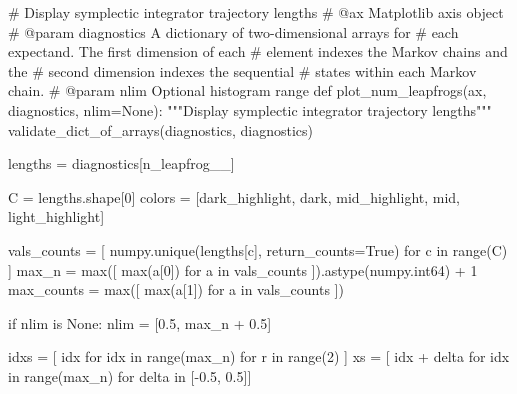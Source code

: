 \documentclass[
  letterpaper,
  DIV=11,
  numbers=noendperiod]{scrartcl}
\newenvironment{Shaded}{\begin{snugshade}}{\end{snugshade}}
\newcommand{\BuiltInTok}[1]{\textcolor[rgb]{0.00,0.23,0.31}{#1}}
\newcommand{\CommentTok}[1]{\textcolor[rgb]{0.37,0.37,0.37}{#1}}
\newcommand{\ControlFlowTok}[1]{\textcolor[rgb]{0.00,0.23,0.31}{#1}}
\newcommand{\DecValTok}[1]{\textcolor[rgb]{0.68,0.00,0.00}{#1}}
\newcommand{\FloatTok}[1]{\textcolor[rgb]{0.68,0.00,0.00}{#1}}
\newcommand{\KeywordTok}[1]{\textcolor[rgb]{0.00,0.23,0.31}{#1}}
\newcommand{\NormalTok}[1]{\textcolor[rgb]{0.00,0.23,0.31}{#1}}
\newcommand{\OperatorTok}[1]{\textcolor[rgb]{0.37,0.37,0.37}{#1}}
\newcommand{\StringTok}[1]{\textcolor[rgb]{0.13,0.47,0.30}{#1}}
\newcommand{\VariableTok}[1]{\textcolor[rgb]{0.07,0.07,0.07}{#1}}
\begin{document}
\begin{Shaded}
\begin{Highlighting}[]
\CommentTok{\# Display symplectic integrator trajectory lengths}
\CommentTok{\# @ax Matplotlib axis object}
\CommentTok{\# @param diagnostics A dictionary of two{-}dimensional arrays for}
\CommentTok{\#                    each expectand.  The first dimension of each}
\CommentTok{\#                    element indexes the Markov chains and the}
\CommentTok{\#                    second dimension indexes the sequential}
\CommentTok{\#                    states within each Markov chain.}
\CommentTok{\# @param nlim Optional histogram range}
\KeywordTok{def}\NormalTok{ plot\_num\_leapfrogs(ax, diagnostics, nlim}\OperatorTok{=}\VariableTok{None}\NormalTok{):}
  \CommentTok{"""Display symplectic integrator trajectory lengths"""}
\NormalTok{  validate\_dict\_of\_arrays(diagnostics, }\StringTok{\textquotesingle{}diagnostics\textquotesingle{}}\NormalTok{)}

\NormalTok{  lengths }\OperatorTok{=}\NormalTok{ diagnostics[}\StringTok{\textquotesingle{}n\_leapfrog\_\_\textquotesingle{}}\NormalTok{]}

\NormalTok{  C }\OperatorTok{=}\NormalTok{ lengths.shape[}\DecValTok{0}\NormalTok{]}
\NormalTok{  colors }\OperatorTok{=}\NormalTok{ [dark\_highlight, dark, mid\_highlight, mid, light\_highlight]}

\NormalTok{  vals\_counts }\OperatorTok{=}\NormalTok{ [ numpy.unique(lengths[c], return\_counts}\OperatorTok{=}\VariableTok{True}\NormalTok{)}
                  \ControlFlowTok{for}\NormalTok{ c }\KeywordTok{in} \BuiltInTok{range}\NormalTok{(C) ]}
\NormalTok{  max\_n }\OperatorTok{=} \BuiltInTok{max}\NormalTok{([ }\BuiltInTok{max}\NormalTok{(a[}\DecValTok{0}\NormalTok{]) }\ControlFlowTok{for}\NormalTok{ a }\KeywordTok{in}\NormalTok{ vals\_counts ]).astype(numpy.int64) }\OperatorTok{+} \DecValTok{1}
\NormalTok{  max\_counts }\OperatorTok{=} \BuiltInTok{max}\NormalTok{([ }\BuiltInTok{max}\NormalTok{(a[}\DecValTok{1}\NormalTok{]) }\ControlFlowTok{for}\NormalTok{ a }\KeywordTok{in}\NormalTok{ vals\_counts ])}

  \ControlFlowTok{if}\NormalTok{ nlim }\KeywordTok{is} \VariableTok{None}\NormalTok{:}
\NormalTok{    nlim }\OperatorTok{=}\NormalTok{ [}\FloatTok{0.5}\NormalTok{, max\_n }\OperatorTok{+} \FloatTok{0.5}\NormalTok{]}

\NormalTok{  idxs }\OperatorTok{=}\NormalTok{ [ idx }\ControlFlowTok{for}\NormalTok{ idx }\KeywordTok{in} \BuiltInTok{range}\NormalTok{(max\_n) }\ControlFlowTok{for}\NormalTok{ r }\KeywordTok{in} \BuiltInTok{range}\NormalTok{(}\DecValTok{2}\NormalTok{) ]}
\NormalTok{  xs }\OperatorTok{=}\NormalTok{ [ idx }\OperatorTok{+}\NormalTok{ delta }\ControlFlowTok{for}\NormalTok{ idx }\KeywordTok{in} \BuiltInTok{range}\NormalTok{(max\_n) }\ControlFlowTok{for}\NormalTok{ delta }\KeywordTok{in}\NormalTok{ [}\OperatorTok{{-}}\FloatTok{0.5}\NormalTok{, }\FloatTok{0.5}\NormalTok{]]}


\end{Highlighting}
\end{Shaded}
\end{document}
